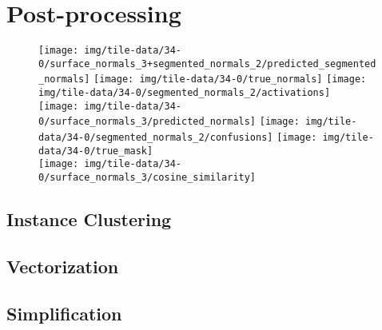 \chapter{Post-processing}%
\label{chap:post-processing}

\begin{figure}
  \centering
  \texttt{[image: img/tile-data/34-0/surface\_normals\_3+segmented\_normals\_2/predicted\_segmented\_normals]}
  \texttt{[image: img/tile-data/34-0/true\_normals]}
  \texttt{[image: img/tile-data/34-0/segmented\_normals\_2/activations]}
  \\
  \texttt{[image: img/tile-data/34-0/surface\_normals\_3/predicted\_normals]}
  \texttt{[image: img/tile-data/34-0/segmented\_normals\_2/confusions]}
  \texttt{[image: img/tile-data/34-0/true\_mask]}
  \\
  \hspace{2.15em}\texttt{[image: img/tile-data/34-0/surface\_normals\_3/cosine\_similarity]}
\end{figure}

\section{Instance Clustering}


\section{Vectorization}


\section{Simplification}

